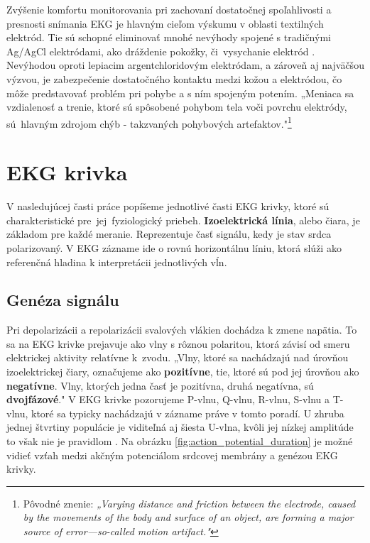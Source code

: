 Zvýšenie komfortu monitorovania pri zachovaní dostatočnej spoľahlivosti a presnosti snímania EKG je hlavným cieľom výskumu v oblasti textilných elektród. Tie sú schopné eliminovať mnohé nevýhody spojené s tradičnými Ag/AgCl elektródami, ako dráždenie pokožky, či~vysychanie elektród \cite{Arquilla2020}. Nevýhodou oproti lepiacim argentchloridovým elektródam, a zároveň aj najväčšou výzvou, je zabezpečenie dostatočného kontaktu medzi kožou a elektródou, čo môže predstavovať problém pri pohybe a s ním spojeným potením. „Meniaca sa vzdialenosť a trenie, ktoré sú spôsobené pohybom tela voči povrchu elektródy, sú~hlavným zdrojom chýb - takzvaných pohybových artefaktov."\footnote{Pôvodné znenie: \textit{„Varying distance and friction between the electrode, caused by the movements of the body and surface of an object, are forming a major source of error—so-called motion artifact."}} \cite{Metshein2021}


\section{EKG krivka}

V nasledujúcej časti práce popíšeme jednotlivé časti EKG krivky, ktoré sú charakteristické pre~jej~fyziologický priebeh. \textbf{Izoelektrická línia}, alebo čiara, je základom pre každé meranie. Reprezentuje časť signálu, kedy je stav srdca polarizovaný. V EKG zázname ide o rovnú horizontálnu líniu, ktorá slúži ako referenčná hladina k interpretácii jednotlivých vĺn.

\subsection{Genéza signálu}

Pri depolarizácii a repolarizácii svalových vlákien dochádza k zmene napätia. To sa na EKG krivke prejavuje ako vlny s rôznou polaritou, ktorá závisí od smeru elektrickej aktivity relatívne k~zvodu. „Vlny, ktoré sa nachádzajú nad úrovňou izoelektrickej čiary, označujeme ako \textbf{pozitívne}, tie, ktoré sú pod jej úrovňou ako \textbf{negatívne}. Vlny, ktorých jedna časť je pozitívna, druhá negatívna, sú \textbf{dvojfázové}." \cite{Bada2010} V EKG krivke pozorujeme P-vlnu, Q-vlnu, R-vlnu, S-vlnu a T-vlnu, ktoré sa typicky nachádzajú v zázname práve v tomto poradí. U zhruba jednej štvrtiny populácie je viditeľná aj šiesta U-vlna, kvôli jej nízkej amplitúde to však nie je pravidlom \cite{Wasilewski2011}. Na obrázku \ref{fig:action_potential_duration} je možné vidieť vzťah medzi akčným potenciálom srdcovej membrány a genézou EKG krivky.


